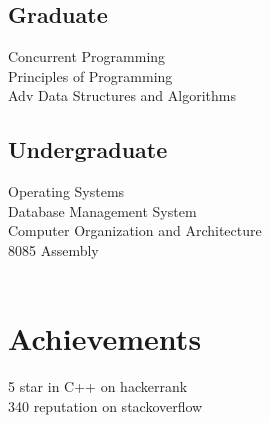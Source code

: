 \documentclass[]{deedy-resume-openfont}
\begin{document}
\begin{minipage}[t]{0.33\textwidth}
\subsection{Graduate}
Concurrent Programming \\
Principles of Programming \\
Adv Data Structures and Algorithms
\subsection{Undergraduate}
Operating Systems \\
Database Management System\\
Computer Organization and Architecture \\
8085 Assembly \\
\\
\sectionsep




\section{Achievements} 
5 star in C++ on hackerrank\\
340 reputation on stackoverflow\\

\sectionsep



%
%

\end{minipage} 
\end{document}
